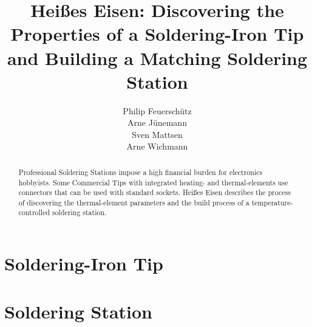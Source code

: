 \documentclass[a4paper]{IEEEconf}
\title{Heißes Eisen: Discovering the Properties of a Soldering-Iron Tip
and Building a Matching Soldering Station}
\author{%
	Philip Feuerschütz\\
	Arne Jünemann\\
	Sven Mattsen\\
	Arne Wichmann\\
}
\begin{document}
 
\maketitle{}
\begin{abstract}
Professional Soldering Stations impose a high financial burden for
electronics hobbyists. Some Commercial Tips with integrated
heating- and thermal-elements use connectors that can be used with
standard sockets. Heißes Eisen describes the process of discovering the
thermal-element parameters and the build process of a
temperature-controlled soldering station.
\end{abstract}

\part{Soldering-Iron Tip}

\part{Soldering Station}

\end{document}

